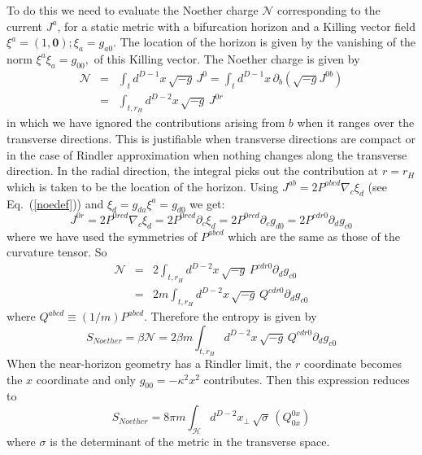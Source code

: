 \documentclass[12pt]{iopart}
\def\eq#1{{Eq.~(\ref{#1})}}
\def\mes#1#2{\int_{#2} d^{#1}x\, \sqrt{-g}\, }
\def\mes#1#2{\int_{#2} d^{#1}x\, \sqrt{-g}\, }
\begin{document}
To do this we need  to evaluate the Noether charge $\mathcal{N}$ corresponding to the current $J^a$, for a static metric with a bifurcation horizon and a Killing vector field $\xi^a = (1, \textbf{0}); \xi_a = g_{a0}$. The location of the horizon is given by the vanishing of the norm $\xi^a\xi_a = g_{00},$ of this  Killing vector.
The  Noether charge is given by
\begin{eqnarray}
\mathcal{N} &=& \mes{D-1}{t} J^0 =\int_{t} d^{D-1}x\, \partial_b(\sqrt{-g} J^{0b})\nonumber\\
&=&\mes{D-2}{t,r_H} J^{0r}
\end{eqnarray} 
in which we have ignored the contributions arising from $b$ when it ranges over the transverse directions. This is
justifiable when transverse directions are compact or in the case of Rindler approximation
when nothing changes along the transverse direction. In the radial direction, the integral picks out the contribution at $r=r_H$ which is taken to be the location of the horizon.
Using  
$J^{ab} =2 P^{abcd}\nabla_c \xi_d $ (see \eq{noedef}) and $\xi_d = g_{da} \xi^a = g_{d0}$ we get:
\begin{equation}
J^{0r}= 2P^{0rcd} \nabla_c \xi_d = 2 P^{0rcd} \partial_c\xi_d = 2 P^{0rcd} \partial_c g_{d0} = 2 P^{cdr0} \partial_d g_{c0}
\end{equation} 
where we have used the symmetries of 
 $P^{abcd} $   which are the same as those of the curvature tensor.
 So
\begin{eqnarray}
\mathcal{N} &=& 2 \mes{D-2}{t,r_H} P^{cdr0}\partial_d g_{c0}\nonumber\\
&=&2m \mes{D-2}{t,r_H} Q^{cdr0}\partial_d g_{c0}
\label{n}
\end{eqnarray} 
where $Q^{abcd}\equiv(1/m)P^{abcd}$. Therefore the entropy is  given by
\begin{equation}
S_{Noether}=\beta\mathcal{N} = 2\beta m \mes{D-2}{t,r_H} Q^{cdr0}\partial_d g_{c0}
\label{s}
\end{equation}  
When the near-horizon geometry has a Rindler limit, the $r$ coordinate becomes the $x$ coordinate and only $g_{00}=-\kappa^2x^2$ contributes. Then this expression reduces to
\begin{equation}
S_{Noether} = 8\pi m \int_\mathcal{H} d^{D-2}x_\perp\, \sqrt{\sigma}\, \left( Q_{0x}^{0x}\right)
\label{res1}
\end{equation} 
where $\sigma$ is the determinant of the metric in the transverse space.
\end{document}
